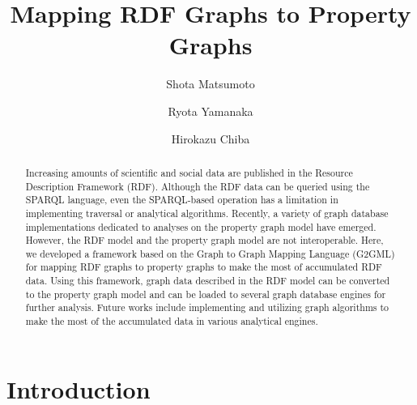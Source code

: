 \documentclass[runningheads]{llncs}
\begin{document}
%
\title{Mapping RDF Graphs to Property Graphs}
%
%
\author{Shota Matsumoto \and Ryota Yamanaka \and Hirokazu Chiba}
%
%
%
\maketitle              %
%
\begin{abstract}
Increasing amounts of scientific and social data are published in the Resource Description Framework (RDF). Although the RDF data can be queried using the SPARQL language, even the SPARQL-based operation has a limitation in implementing traversal or analytical algorithms.
Recently, a variety of graph database implementations dedicated to analyses on the property graph model have emerged.
However, the RDF model and the property graph model are not interoperable.
Here, we developed a framework based on the Graph to Graph Mapping Language (G2GML) for mapping RDF graphs to property graphs to make the most of accumulated RDF data.
Using this framework, graph data described in the RDF model can be converted to the property graph model and can be loaded to several graph database engines for further analysis. Future works include implementing and utilizing graph algorithms to make the most of the accumulated data in various analytical engines.

\end{abstract}

\section{Introduction}
\end{document}
